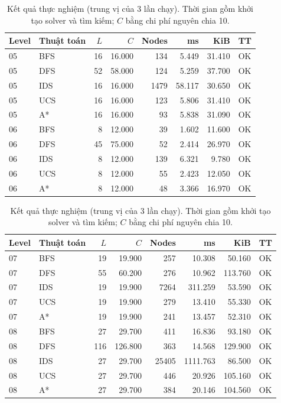 \begin{table}[htbp]
\centering
\small
\begin{tabular}{llrrrrrl}
\hline
Level & Thuật toán & $L$ & $C$ & Nodes & ms & KiB & TT \\
\hline
05 & BFS & 16 & 16.000 & 134 & 5.449 & 31.410 & OK \\
05 & DFS & 52 & 58.000 & 124 & 5.259 & 37.700 & OK \\
05 & IDS & 16 & 16.000 & 1479 & 58.117 & 30.650 & OK \\
05 & UCS & 16 & 16.000 & 123 & 5.806 & 31.410 & OK \\
05 & A* & 16 & 16.000 & 93 & 5.838 & 31.090 & OK \\
06 & BFS & 8 & 12.000 & 39 & 1.602 & 11.600 & OK \\
06 & DFS & 45 & 75.000 & 52 & 2.414 & 26.970 & OK \\
06 & IDS & 8 & 12.000 & 139 & 6.321 & 9.780 & OK \\
06 & UCS & 8 & 12.000 & 55 & 2.423 & 12.050 & OK \\
06 & A* & 8 & 12.000 & 48 & 3.366 & 16.970 & OK \\
\hline
\end{tabular}
\caption{Kết quả thực nghiệm (trung vị của 3 lần chạy). Thời gian gồm khởi tạo solver và tìm kiếm; $C$ bằng chi phí nguyên chia 10.}
\end{table}

\begin{table}[htbp]
\centering
\small
\begin{tabular}{llrrrrrl}
\hline
Level & Thuật toán & $L$ & $C$ & Nodes & ms & KiB & TT \\
\hline
07 & BFS & 19 & 19.900 & 257 & 10.308 & 50.160 & OK \\
07 & DFS & 55 & 60.200 & 276 & 10.962 & 113.760 & OK \\
07 & IDS & 19 & 19.900 & 7264 & 311.259 & 53.590 & OK \\
07 & UCS & 19 & 19.900 & 279 & 13.410 & 55.330 & OK \\
07 & A* & 19 & 19.900 & 241 & 13.457 & 52.310 & OK \\
08 & BFS & 27 & 29.700 & 411 & 16.836 & 93.180 & OK \\
08 & DFS & 116 & 126.800 & 363 & 14.568 & 129.900 & OK \\
08 & IDS & 27 & 29.700 & 25405 & 1111.763 & 86.500 & OK \\
08 & UCS & 27 & 29.700 & 446 & 20.926 & 105.160 & OK \\
08 & A* & 27 & 29.700 & 384 & 20.146 & 104.560 & OK \\
\hline
\end{tabular}
\caption{Kết quả thực nghiệm (trung vị của 3 lần chạy). Thời gian gồm khởi tạo solver và tìm kiếm; $C$ bằng chi phí nguyên chia 10.}
\end{table}

